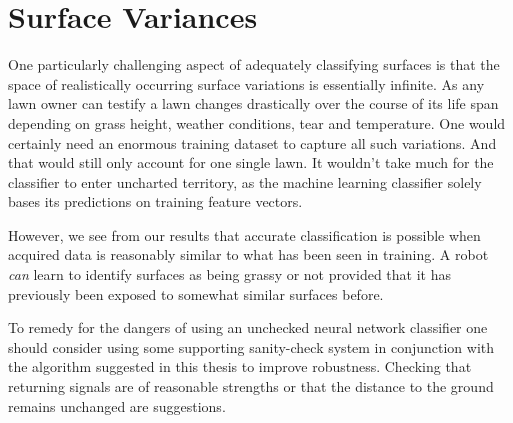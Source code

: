 \section{Surface Variances}

One particularly challenging aspect of adequately classifying surfaces is that the space of realistically occurring surface variations is essentially infinite. As any lawn owner can testify a lawn changes drastically over the course of its life span depending on grass height, weather conditions, tear and temperature. One would certainly need an enormous training dataset to capture all such variations. And that would still only account for one single lawn. It wouldn't take much for the classifier to enter uncharted territory, as the machine learning classifier solely bases its predictions on training feature vectors.

However, we see from our results that accurate classification is possible when acquired data is reasonably similar to what has been seen in training. A robot \emph{can} learn to identify surfaces as being grassy or not provided that it has previously been exposed to somewhat similar surfaces before. 

To remedy for the dangers of using an unchecked neural network classifier one should consider using some supporting sanity-check system in conjunction with the algorithm suggested in this thesis to improve robustness. Checking that returning signals are of reasonable strengths or that the distance to the ground remains unchanged are suggestions.









